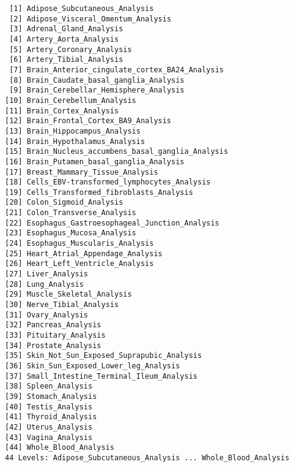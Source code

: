 \documentclass[11pt]{article}
\begin{document}
\begin{verbatim}
 [1] Adipose_Subcutaneous_Analysis
 [2] Adipose_Visceral_Omentum_Analysis
 [3] Adrenal_Gland_Analysis
 [4] Artery_Aorta_Analysis
 [5] Artery_Coronary_Analysis
 [6] Artery_Tibial_Analysis
 [7] Brain_Anterior_cingulate_cortex_BA24_Analysis
 [8] Brain_Caudate_basal_ganglia_Analysis
 [9] Brain_Cerebellar_Hemisphere_Analysis
[10] Brain_Cerebellum_Analysis
[11] Brain_Cortex_Analysis
[12] Brain_Frontal_Cortex_BA9_Analysis
[13] Brain_Hippocampus_Analysis
[14] Brain_Hypothalamus_Analysis
[15] Brain_Nucleus_accumbens_basal_ganglia_Analysis
[16] Brain_Putamen_basal_ganglia_Analysis
[17] Breast_Mammary_Tissue_Analysis
[18] Cells_EBV-transformed_lymphocytes_Analysis
[19] Cells_Transformed_fibroblasts_Analysis
[20] Colon_Sigmoid_Analysis
[21] Colon_Transverse_Analysis
[22] Esophagus_Gastroesophageal_Junction_Analysis
[23] Esophagus_Mucosa_Analysis
[24] Esophagus_Muscularis_Analysis
[25] Heart_Atrial_Appendage_Analysis
[26] Heart_Left_Ventricle_Analysis
[27] Liver_Analysis
[28] Lung_Analysis
[29] Muscle_Skeletal_Analysis
[30] Nerve_Tibial_Analysis
[31] Ovary_Analysis
[32] Pancreas_Analysis
[33] Pituitary_Analysis
[34] Prostate_Analysis
[35] Skin_Not_Sun_Exposed_Suprapubic_Analysis
[36] Skin_Sun_Exposed_Lower_leg_Analysis
[37] Small_Intestine_Terminal_Ileum_Analysis
[38] Spleen_Analysis
[39] Stomach_Analysis
[40] Testis_Analysis
[41] Thyroid_Analysis
[42] Uterus_Analysis
[43] Vagina_Analysis
[44] Whole_Blood_Analysis
44 Levels: Adipose_Subcutaneous_Analysis ... Whole_Blood_Analysis
\end{verbatim}
\end{document}
